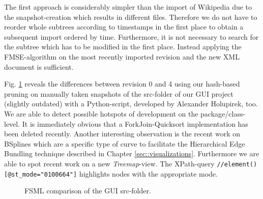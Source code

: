 The first approach is considerably simpler than the import of Wikipedia due to the snapshot-creation which results in different files. Therefore we do not have to reorder whole subtrees according to timestamps in the first place to obtain a subsequent import ordered by time. Furthermore, it is not necessary to search for the subtree which has to be modified in the first place. Instead applying the FMSE-algorithm on the most recently imported revision and the new XML document is sufficient.

Fig. \ref{fig:fsml-gui} reveals the differences between revision 0 and 4 using our hash-based pruning on manually taken snapshots of the src-folder of our GUI project (slightly outdated) with a Python-script, developed by Alexander Holupirek, too. We are able to detect possible hotspots of development on the package/class-level. It is immediately obvious that a ForkJoin-Quicksort implementation has been deleted recently. Another interesting observation is the recent work on BSplines which are a specific type of curve to facilitate the Hierarchical Edge Bundling technique described in Chapter \ref{sec::visualizations}. Furthermore we are able to spot recent work on a new \emph{Treemap}-view. The XPath-query \texttt{//element()[@st\_mode="0100664"]} highlights nodes with the appropriate mode.

\begin{figure}[tb]
\caption{\label{fig:fsml-gui} FSML comparison of the GUI src-folder.}
\end{figure}


